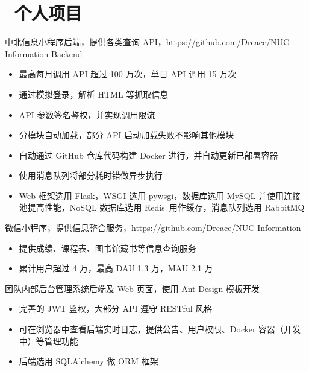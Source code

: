 \documentclass{resume}
\begin{document}
\section{\faUsers\ 个人项目}
\begin{onehalfspacing}
  中北信息小程序后端，提供各类查询 API，https://github.com/Dreace/NUC-Information-Backend
  \begin{itemize}
    \item 最高每月调用 API 超过 100 万次，单日 API 调用 15 万次
    \item 通过模拟登录，解析 HTML 等抓取信息
    \item API 参数签名鉴权，并实现调用限流
    \item 分模块自动加载，部分 API 启动加载失败不影响其他模块
    \item 自动通过 GitHub 仓库代码构建 Docker 进行，并自动更新已部署容器
    \item 使用消息队列将部分耗时错做异步执行
    \item Web 框架选用 Flask，WSGI 选用 pywsgi，数据库选用 MySQL 并使用连接池提高性能，NoSQL 数据库选用 Redis\
          用作缓存，消息队列选用 RabbitMQ
  \end{itemize}
\end{onehalfspacing}

\begin{onehalfspacing}
  微信小程序，提供信息整合服务，https://github.com/Dreace/NUC-Information
  \begin{itemize}
    \item 提供成绩、课程表、图书馆藏书等信息查询服务
    \item 累计用户超过 4 万，最高 DAU 1.3 万，MAU 2.1 万
  \end{itemize}
\end{onehalfspacing}

\begin{onehalfspacing}
  团队内部后台管理系统后端及 Web 页面，使用 Ant Design 模板开发
  \begin{itemize}
    \item 完善的 JWT 鉴权，大部分 API 遵守 RESTful 风格
    \item 可在浏览器中查看后端实时日志，提供公告、用户权限、Docker 容器（开发中）等管理功能
    \item 后端选用 SQLAlchemy 做 ORM 框架
  \end{itemize}
\end{onehalfspacing}
\end{document}
